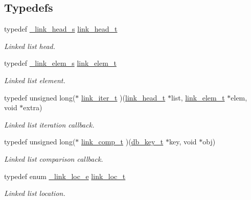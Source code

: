 \subsection*{Typedefs}
\begin{CompactItemize}
\item 
typedef \hyperlink{struct__link__head__s}{\_\-link\_\-head\_\-s} \hyperlink{group__dbprim__link_ga0}{link\_\-head\_\-t}
\begin{CompactList}\small\item\em Linked list head. \item\end{CompactList}\item 
typedef \hyperlink{struct__link__elem__s}{\_\-link\_\-elem\_\-s} \hyperlink{group__dbprim__link_ga1}{link\_\-elem\_\-t}
\begin{CompactList}\small\item\em Linked list element. \item\end{CompactList}\item 
typedef unsigned long($\ast$ \hyperlink{group__dbprim__link_ga2}{link\_\-iter\_\-t} )(\hyperlink{struct__link__head__s}{link\_\-head\_\-t} $\ast$list, \hyperlink{struct__link__elem__s}{link\_\-elem\_\-t} $\ast$elem, void $\ast$extra)
\begin{CompactList}\small\item\em Linked list iteration callback. \item\end{CompactList}\item 
typedef unsigned long($\ast$ \hyperlink{group__dbprim__link_ga3}{link\_\-comp\_\-t} )(\hyperlink{struct__db__key__s}{db\_\-key\_\-t} $\ast$key, void $\ast$obj)
\begin{CompactList}\small\item\em Linked list comparison callback. \item\end{CompactList}\item 
typedef enum \hyperlink{group__dbprim__link_ga28}{\_\-link\_\-loc\_\-e} \hyperlink{group__dbprim__link_ga4}{link\_\-loc\_\-t}
\begin{CompactList}\small\item\em Linked list location. \item\end{CompactList}\end{CompactItemize}
